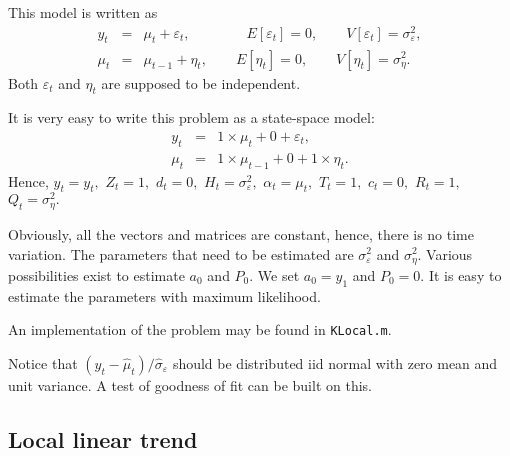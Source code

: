 \documentclass[12pt,a4paper]{article}
\begin{document}
This model is written as%
\begin{eqnarray*}
y_{t} &=&\mu _{t}+\varepsilon _{t},\qquad \qquad E[\varepsilon
_{t}]=0,\qquad V[\varepsilon _{t}]=\sigma _{\varepsilon }^{2}, \\
\mu _{t} &=&\mu _{t-1}+\eta _{t},\qquad E[\eta _{t}]=0,\qquad V[\eta
_{t}]=\sigma _{\eta }^{2}.
\end{eqnarray*}%
Both $\varepsilon _{t}$ and $\eta _{t}$ are supposed to be
independent.

It is very easy to write this problem as a state-space model:%
\begin{eqnarray*}
y_{t} &=&1\times \mu _{t}+0+\varepsilon _{t}, \\
\mu _{t} &=&1\times \mu _{t-1}+0+1\times \eta _{t}.
\end{eqnarray*}
Hence, $y_{t}=y_{t},$ $Z_{t}=1,$ $d_{t}=0,$ $H_{t}=\sigma _{\varepsilon
}^{2},$ $\alpha _{t}=\mu _{t},$ $T_{t}=1,$ $c_{t}=0,$ $R_{t}=1,$ $%
Q_{t}=\sigma _{\eta }^{2}.$

Obviously, all the vectors and matrices are constant, hence, there
is no time variation. The parameters that need to be estimated are
$\sigma _{\varepsilon }^{2}$ and $\sigma _{\eta }^{2}$. Various
possibilities exist to estimate $a_{0}$ and $P_{0}$. We set
$a_{0}=y_{1}$ and $P_{0}=0$. It is easy to estimate the parameters
with maximum likelihood.

An implementation of the problem may be found in
\texttt{KLocal.m}.

Notice that $(y_{t}-\widehat{\mu }_{t})/\widehat{\sigma }_{\varepsilon }$
should be distributed iid normal with zero mean and unit variance. A test of
goodness of fit can be built on this.

\subsection{Local linear trend}
\end{document}

